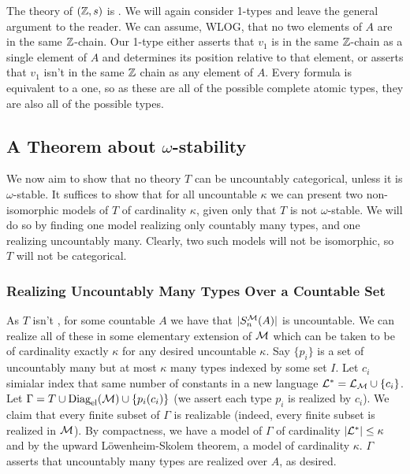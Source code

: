 \begin{example}\label{example_omst_Z}
The theory of \((\mathbb{Z}, s)\) is \omst. 
We will again consider 1-types and leave the general argument to the reader. 
We can assume, WLOG, that no two elements of \(A\) are in the same \(\mathbb{Z}\)-chain. 
Our 1-type either asserts that \(v_1\) is in the same \(\mathbb{Z}\)-chain as a single element of \(A\) and determines its position relative to that element, or asserts that \(v_1\) isn't in the same \(\mathbb{Z}\) chain as any element of \(A\). 
Every formula is equivalent to a \qf one, so as these are all of the possible complete atomic types, they are also all of the possible types.    %
\end{example}

\subsection{A Theorem about \(\omega\)-stability}

We now aim to show that no theory \(T\) can be uncountably categorical, unless it is \(\omega\)-stable.
It suffices to show that for all uncountable \(\kappa\) we can present two non-isomorphic models of \(T\) of cardinality \(\kappa\), given only that \(T\) is not \(\omega\)-stable.  
We will do so by finding one model realizing only countably many types, and one realizing uncountably many. 
Clearly, two such models will not be isomorphic, so \(T\) will not be categorical. 

\subsubsection{Realizing Uncountably Many Types Over a Countable Set}
As \(T\) isn't \omst, for some countable \(A\) we have that \(|S_n^{\mathcal{M}}(A)|\) is uncountable. 
We can realize all of these in some elementary extension of \(\mathcal{M}\) which can be taken to be of cardinality exactly \(\kappa\) for any desired uncountable \(\kappa\). %
Say \(\{p_i\}\) is a set of uncountably many but at most \(\kappa\) many types indexed by some set \(I\). 
Let \(c_i\) simialar index that same number of constants in a new language \(\mathcal{L}^* = \mathcal{L}_{\mathcal{M}} \cup \{c_i\}\). 
Let \(\Gamma = T \cup \text{Diag}_\text{el}(\mathcal{M}) \cup \{p_i(c_i)\}\) (we assert each type \(p_i\) is realized by \(c_i\)). 
We claim that every finite subset of \(\Gamma\) is realizable (indeed, every finite subset is realized in \(\mathcal{M}\)). 
By compactness, we have a model of \(\Gamma\) of cardinality \(|\mathcal{L}^*| \leq \kappa\) and by the upward L\"owenheim-Skolem theorem, a model of cardinality \(\kappa\).
\(\Gamma\) asserts that uncountably many types are realized over \(A\), as desired. 

